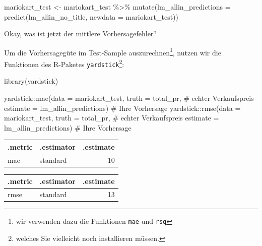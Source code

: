 \documentclass[
  letterpaper,
]{scrbook}
\newenvironment{Shaded}{\begin{snugshade}}{\end{snugshade}}
\newcommand{\AttributeTok}[1]{\textcolor[rgb]{0.40,0.45,0.13}{#1}}
\newcommand{\CommentTok}[1]{\textcolor[rgb]{0.37,0.37,0.37}{#1}}
\newcommand{\FunctionTok}[1]{\textcolor[rgb]{0.28,0.35,0.67}{#1}}
\newcommand{\NormalTok}[1]{\textcolor[rgb]{0.00,0.23,0.31}{#1}}
\newcommand{\OtherTok}[1]{\textcolor[rgb]{0.00,0.23,0.31}{#1}}
\newcommand{\SpecialCharTok}[1]{\textcolor[rgb]{0.37,0.37,0.37}{#1}}
\theoremstyle{definition}
\theoremstyle{definition}
\theoremstyle{definition}
\theoremstyle{remark}
\begin{document}
\begin{Shaded}
\begin{Highlighting}[]
\NormalTok{mariokart\_test }\OtherTok{\textless{}{-}}
\NormalTok{  mariokart\_test }\SpecialCharTok{\%\textgreater{}\%} 
  \FunctionTok{mutate}\NormalTok{(}\AttributeTok{lm\_allin\_predictions =} \FunctionTok{predict}\NormalTok{(lm\_allin\_no\_title, }\AttributeTok{newdata =}\NormalTok{ mariokart\_test))}
\end{Highlighting}
\end{Shaded}

Okay, was ist jetzt der mittlere Vorhersagefehler?

Um die Vorhersagegüte im Test-Sample auszurechnen\footnote{wir verwenden
  dazu die Funktionen \texttt{mae} und \texttt{rsq}}, nutzen wir die
Funktionen des R-Paketes \texttt{yardstick}\footnote{welches Sie
  vielleicht noch installieren müssen.}:

\begin{Shaded}
\begin{Highlighting}[]
\FunctionTok{library}\NormalTok{(yardstick)}

\NormalTok{yardstick}\SpecialCharTok{::}\FunctionTok{mae}\NormalTok{(}\AttributeTok{data =}\NormalTok{ mariokart\_test,}
               \AttributeTok{truth =}\NormalTok{ total\_pr,  }\CommentTok{\# echter Verkaufspreis}
               \AttributeTok{estimate =}\NormalTok{ lm\_allin\_predictions)  }\CommentTok{\# Ihre Vorhersage}
\NormalTok{yardstick}\SpecialCharTok{::}\FunctionTok{rmse}\NormalTok{(}\AttributeTok{data =}\NormalTok{ mariokart\_test,}
               \AttributeTok{truth =}\NormalTok{ total\_pr,  }\CommentTok{\# echter Verkaufspreis}
               \AttributeTok{estimate =}\NormalTok{ lm\_allin\_predictions)  }\CommentTok{\# Ihre Vorhersage}
\end{Highlighting}
\end{Shaded}

\begin{longtable}[]{@{}llr@{}}
\toprule\noalign{}
.metric & .estimator & .estimate \\
\midrule\noalign{}
\endhead
\bottomrule\noalign{}
\endlastfoot
mae & standard & 10 \\
\end{longtable}

\begin{longtable}[]{@{}llr@{}}
\toprule\noalign{}
.metric & .estimator & .estimate \\
\midrule\noalign{}
\endhead
\bottomrule\noalign{}
\endlastfoot
rmse & standard & 13 \\
\end{longtable}
\end{document}
